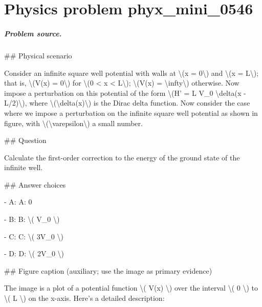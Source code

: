 
\chapter{Physics problem phyx\_mini\_0546}
\label{ch:PhyXMiniProblems_problem_phyx_mini_0546}

\paragraph{Problem source.}
\#\# Physical scenario

Consider an infinite square well potential with walls at \textbackslash{}(x = 0\textbackslash{}) and \textbackslash{}(x = L\textbackslash{}); that is,
\textbackslash{}(V(x) = 0\textbackslash{}) for \textbackslash{}(0 < x < L\textbackslash{}); \textbackslash{}(V(x) = \textbackslash{}infty\textbackslash{}) otherwise. Now impose a perturbation on this potential of the form \textbackslash{}(H' = L V\_0 \textbackslash{}delta(x - L/2)\textbackslash{}), where \textbackslash{}(\textbackslash{}delta(x)\textbackslash{}) is the Dirac delta function. Now consider the case where we impose a perturbation on the infinite square well potential as shown in figure, with \textbackslash{}(\textbackslash{}varepsilon\textbackslash{}) a small number.

\#\# Question

Calculate the first-order correction to the energy of the ground state of the infinite well.

\#\# Answer choices

- A: A: 0

- B: B: \textbackslash{}( V\_0 \textbackslash{})

- C: C: \textbackslash{}( 3V\_0 \textbackslash{})

- D: D: \textbackslash{}( 2V\_0 \textbackslash{})

\#\# Figure caption (auxiliary; use the image as primary evidence)

The image is a plot of a potential function \textbackslash{}( V(x) \textbackslash{}) over the interval \textbackslash{}( 0 \textbackslash{}) to \textbackslash{}( L \textbackslash{}) on the x-axis. Here's a detailed description:

